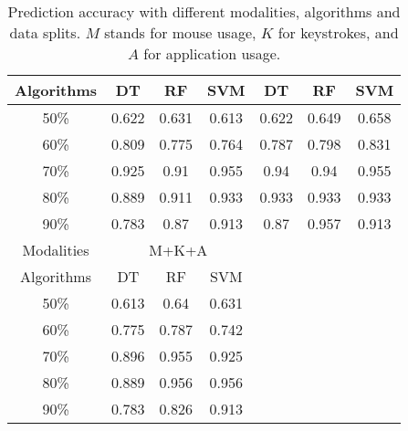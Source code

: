 \begin{table}[h]
\begin{tabular}{|c|c|c|c|ccc}
Algorithms & DT       & RF      & SVM   & \multicolumn{1}{c|}{DT}    & \multicolumn{1}{c|}{RF}    & \multicolumn{1}{c|}{SVM}   \\ \hline
50\%       & 0.622    & 0.631   & 0.613 & \multicolumn{1}{c|}{0.622} & \multicolumn{1}{c|}{0.649} & \multicolumn{1}{c|}{0.658} \\
60\%       & 0.809    & 0.775   & 0.764 & \multicolumn{1}{c|}{0.787} & \multicolumn{1}{c|}{0.798} & \multicolumn{1}{c|}{0.831} \\
70\%       & 0.925    & 0.91    & 0.955 & \multicolumn{1}{c|}{0.94}  & \multicolumn{1}{c|}{0.94}  & \multicolumn{1}{c|}{0.955} \\
80\%       & 0.889    & 0.911   & 0.933 & \multicolumn{1}{c|}{0.933} & \multicolumn{1}{c|}{0.933} & \multicolumn{1}{c|}{0.933} \\
90\%       & 0.783    & 0.87    & 0.913 & \multicolumn{1}{c|}{0.87}  & \multicolumn{1}{c|}{0.957} & \multicolumn{1}{c|}{0.913} \\ \cline{1-4}
Modalities & \multicolumn{3}{c|}{M+K+A} & \multicolumn{3}{l}{}                                                                 \\ \cline{1-4}
Algorithms & DT       & RF      & SVM   & \multicolumn{1}{l}{}       & \multicolumn{1}{l}{}       & \multicolumn{1}{l}{}       \\ \cline{1-4}
50\%       & 0.613    & 0.64    & 0.631 & \multicolumn{1}{l}{}       & \multicolumn{1}{l}{}       & \multicolumn{1}{l}{}       \\
60\%       & 0.775    & 0.787   & 0.742 & \multicolumn{1}{l}{}       & \multicolumn{1}{l}{}       & \multicolumn{1}{l}{}       \\
70\%       & 0.896    & 0.955   & 0.925 & \multicolumn{1}{l}{}       & \multicolumn{1}{l}{}       & \multicolumn{1}{l}{}       \\
80\%       & 0.889    & 0.956   & 0.956 & \multicolumn{1}{l}{}       & \multicolumn{1}{l}{}       & \multicolumn{1}{l}{}       \\
90\%       & 0.783    & 0.826   & 0.913 & \multicolumn{1}{l}{}       & \multicolumn{1}{l}{}       & \multicolumn{1}{l}{}      
\end{tabular}
\caption{Prediction accuracy with different modalities, algorithms and data splits. $M$ stands for mouse usage, $K$ for keystrokes, and $A$ for application usage.}
\label{results}
\end{table}